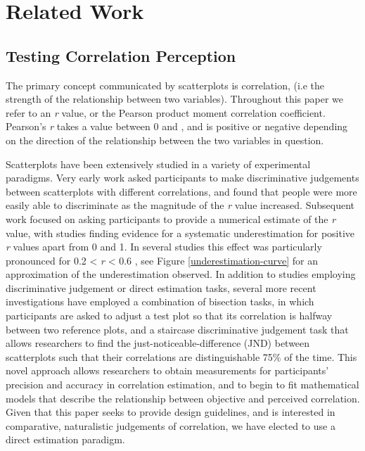 \documentclass[preprint, 3p,
authoryear]{elsarticle} %
\begin{document}
\hypertarget{related-work}{%
\section{Related Work}\label{related-work}}

\hypertarget{testing-correlation-perception}{%
\subsection{Testing Correlation
Perception}\label{testing-correlation-perception}}

The primary concept communicated by scatterplots is correlation, (i.e
the strength of the relationship between two variables). Throughout this
paper we refer to an \emph{r} value, or the Pearson product moment
correlation coefficient. Pearson's \emph{r} takes a value between 0 and
\textbar, and is positive or negative depending on the
direction of the relationship between the two variables in question.

Scatterplots have been extensively studied in a variety of experimental
paradigms. Very early work \citep{pollack_1960} asked participants to
make discriminative judgements between scatterplots with different
correlations, and found that people were more easily able to
discriminate as the magnitude of the \emph{r} value increased.
Subsequent work focused on asking participants to provide a numerical
estimate of the \emph{r} value, with studies finding evidence for a
systematic underestimation for positive \emph{r} values apart from 0 and
1. In several studies this effect was particularly pronounced for 0.2
\textless{} \emph{r} \textless{} 0.6
\citep{strahan_1978, bobko_1979, cleveland_1982, lane_1985, lauer_1989, collyer_1990, meyer_1992},
see Figure \ref{underestimation-curve} for an approximation of the
underestimation observed. In addition to studies employing
discriminative judgement or direct estimation tasks, several more recent
investigations have employed a combination of bisection tasks, in which
participants are asked to adjust a test plot so that its correlation is
halfway between two reference plots, and a staircase discriminative
judgement task that allows researchers to find the
just-noticeable-difference (JND) between scatterplots such that their
correlations are distinguishable 75\% of the time. This novel approach
\citep{rensink_2010} allows researchers to obtain measurements for
participants' precision and accuracy in correlation estimation, and to
begin to fit mathematical models that describe the relationship between
objective and perceived correlation. Given that this paper seeks to
provide design guidelines, and is interested in comparative,
naturalistic judgements of correlation, we have elected to use a direct
estimation paradigm.
\end{document}
